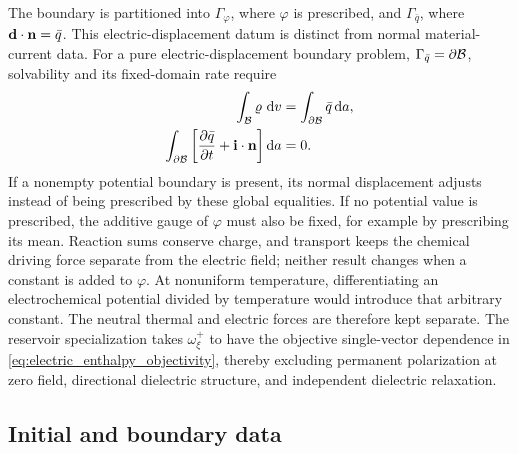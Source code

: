 The boundary is partitioned into \(\Gamma_\varphi\), where \(\varphi\) is
prescribed, and \(\Gamma_{\bar q}\), where
\(\mathbf{d}\cdot\mathbf{n}=\bar q\).  This electric-displacement datum is distinct from
normal material-current data.  For a pure electric-displacement
boundary problem,
\(\Gamma_{\bar q}=\partial\mathcal{B}\), solvability and its fixed-domain rate require
%
\begin{subequations}
	\label{eq:electrical_pure_neumann_compatibility}
	\begin{align}
		\int_{\mathcal{B}}\varrho\,\,{\rm d}v
		 & =
		\int_{\partial\mathcal{B}}\bar q\,{\rm d}a,
		\label{eq:electrical_pure_neumann_gauss_compatibility} \\
		\int_{\partial\mathcal{B}}
		\left[
			\frac{\partial\bar q}{\partial t}
			+
			\mathbf{i}\cdot\mathbf{n}
		\right]{\rm d}a
		 & = 0.
		\label{eq:electrical_pure_neumann_rate_compatibility}
	\end{align}
\end{subequations}
%
If a nonempty potential boundary is present, its normal displacement adjusts
instead of being prescribed by these global equalities.  If no potential value
is prescribed, the additive gauge of \(\varphi\) must also be fixed, for example
by prescribing its mean.  Reaction sums conserve charge, and transport keeps
the chemical driving force separate from the electric field; neither
result changes when a constant is added to \(\varphi\).  At nonuniform
temperature, differentiating an electrochemical potential divided by
temperature would introduce that arbitrary constant.  The neutral thermal and
electric forces are therefore kept separate.  The reservoir
specialization takes
\(\omega_\xi^+\) to have the objective single-vector dependence in
\eqref{eq:electric_enthalpy_objectivity}, thereby excluding permanent
polarization at zero field, directional dielectric structure, and independent
dielectric relaxation.

\subsection{Initial and boundary data}

